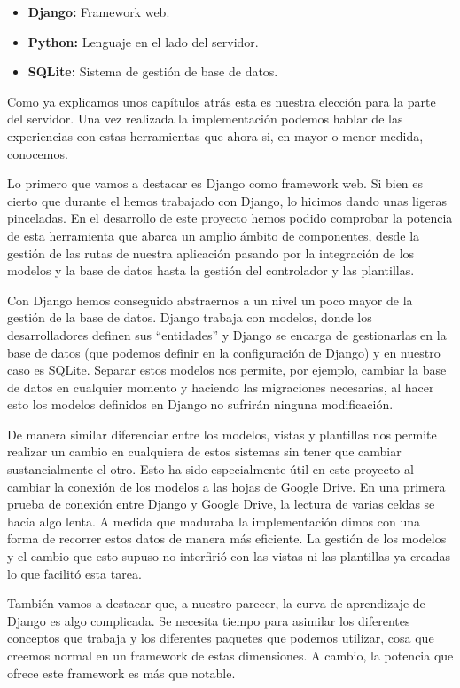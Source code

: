 \begin{itemize}
  \item \textbf{Django:} Framework web.
  \item \textbf{Python:} Lenguaje en el lado del servidor.
  \item \textbf{SQLite:} Sistema de gestión de base de datos.
\end{itemize}

\bigskip
Como ya explicamos unos capítulos atrás esta es nuestra elección para la parte del servidor. Una vez realizada la implementación podemos hablar de las experiencias con estas herramientas que ahora si, en mayor o menor medida, conocemos.

\bigskip
Lo primero que vamos a destacar es Django como framework web. Si bien es cierto que durante el {\grado} hemos trabajado con Django, lo hicimos dando unas ligeras pinceladas. En el desarrollo de este proyecto hemos podido comprobar la potencia de esta herramienta que abarca un amplio ámbito de componentes, desde la gestión de las rutas de nuestra aplicación pasando por la integración de los modelos y la base de datos hasta la gestión del controlador y las plantillas.

\bigskip
Con Django hemos conseguido abstraernos a un nivel un poco mayor de la gestión de la base de datos. Django trabaja con modelos, donde los desarrolladores definen sus ``entidades'' y Django se encarga de gestionarlas en la base de datos (que podemos definir en la configuración de Django) y en nuestro caso es SQLite\cite{sqlite}. Separar estos modelos nos permite, por ejemplo, cambiar la base de datos en cualquier momento y haciendo las migraciones necesarias, al hacer esto los modelos definidos en Django no sufrirán ninguna modificación.

\bigskip
De manera similar diferenciar entre los modelos, vistas y plantillas nos permite realizar un cambio en cualquiera de estos sistemas sin tener que cambiar sustancialmente el otro. Esto ha sido especialmente útil en este proyecto al cambiar la conexión de los modelos a las hojas de Google Drive. En una primera prueba de conexión entre Django y Google Drive, la lectura de varias celdas se hacía algo lenta. A medida que maduraba la implementación dimos con una forma de recorrer estos datos de manera más eficiente. La gestión de los modelos y el cambio que esto supuso no interfirió con las vistas ni las plantillas ya creadas lo que facilitó esta tarea.

\bigskip
También vamos a destacar que, a nuestro parecer, la curva de aprendizaje de Django es algo complicada. Se necesita tiempo para asimilar los diferentes conceptos que trabaja y los diferentes paquetes que podemos utilizar, cosa que creemos normal en un framework de estas dimensiones. A cambio, la potencia que ofrece este framework es más que notable.



